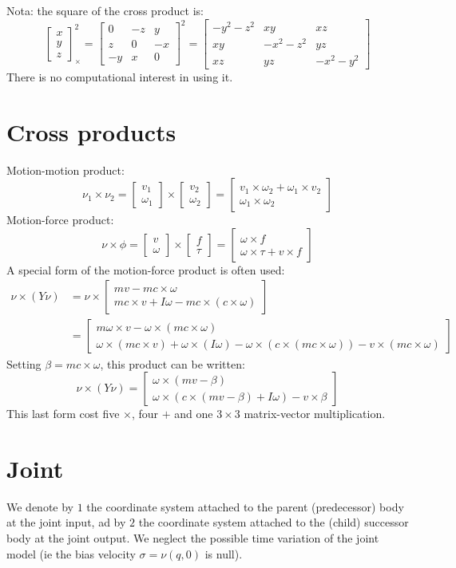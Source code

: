\documentclass[11pt,twoside,a4paper]{article}
\newcommand{\BIN}{\begin{bmatrix}}
\newcommand{\BOUT}{\end{bmatrix}}
\begin{document}
Nota: the square of the cross product is:
$$\BIN x\\y\\z\BOUT_ \times^2 = \BIN 0&-z&y \\ z&0&-x \\ -y&x&0 \BOUT^2 = \BIN -y^2-z^2&xy&xz \\ xy&-x^2-z^2&yz \\ xz&yz&-x^2-y^2 \BOUT$$
There is no computational interest in using it.

\section{Cross products}

Motion-motion product:
$$\nu_1 \times \nu_2 = \BIN v_1\\\omega_1\BOUT \times \BIN v_2\\\omega_2\BOUT = \BIN  v_1 \times \omega_2 + \omega_1 \times v_2 \\ \omega_1 \times \omega_2 \BOUT $$
Motion-force product:
$$\nu \times \phi =  \BIN v\\\omega\BOUT \times \BIN f\\ \tau \BOUT = \BIN  \omega \times f \\ \omega \times \tau + v \times f \BOUT $$
A special form of the motion-force product is often used:
\begin{align*}\nu \times (Y \nu) &= \nu \times \BIN mv - mc\times \omega \\ mc\times v + I \omega - mc\times(c\times \omega) \BOUT \\&= \BIN m \omega\times v - \omega\times(mc\times \omega) \\ \omega \times ( mc \times v) + \omega \times (I\omega) -\omega \times(c \times( mc\times \omega)) -v\times(mc \times \omega)\BOUT\end{align*}
Setting $\beta=mc \times \omega$, this product can be written:
$$\nu \times (Y \nu) = \BIN \omega \times (m v - \beta) \\ \omega \times( c \times (mv-\beta)+I\omega) - v \times \beta \BOUT$$
This last form cost five $\times$, four $+$ and one $3\times3$ matrix-vector multiplication.

\section{Joint}

We denote by $1$ the coordinate system attached to the parent (predecessor) body at the joint input, ad by $2$ the coordinate system attached to the (child) successor body at the joint output. We neglect the possible time variation of the joint model (ie the bias velocity $\sigma = \nu(q,0)$ is null).
\end{document}
